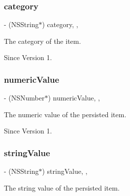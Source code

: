 \subsubsection{\texorpdfstring{category}{category}}
{\footnotesize\ttfamily -\/ (N\+S\+String$\ast$) category\hspace{0.3cm}{\ttfamily [read]}, {\ttfamily [nonatomic]}, {\ttfamily [assign]}}



The category of the item. 

\begin{DoxySince}{Since}
Version 1. 
\end{DoxySince}
\hypertarget{interface_x_i_time_series_item_ac7aef9ac45dd3fff659a50c77eacd25f}{}\label{interface_x_i_time_series_item_ac7aef9ac45dd3fff659a50c77eacd25f} 
\subsubsection{\texorpdfstring{numeric\+Value}{numericValue}}
{\footnotesize\ttfamily -\/ (N\+S\+Number$\ast$) numeric\+Value\hspace{0.3cm}{\ttfamily [read]}, {\ttfamily [nonatomic]}, {\ttfamily [assign]}}



The numeric value of the persisted item. 

\begin{DoxySince}{Since}
Version 1. 
\end{DoxySince}
\hypertarget{interface_x_i_time_series_item_aaac051a1a8024f6da2410ee2072fafa0}{}\label{interface_x_i_time_series_item_aaac051a1a8024f6da2410ee2072fafa0} 
\subsubsection{\texorpdfstring{string\+Value}{stringValue}}
{\footnotesize\ttfamily -\/ (N\+S\+String$\ast$) string\+Value\hspace{0.3cm}{\ttfamily [read]}, {\ttfamily [nonatomic]}, {\ttfamily [assign]}}



The string value of the persisted item. 

